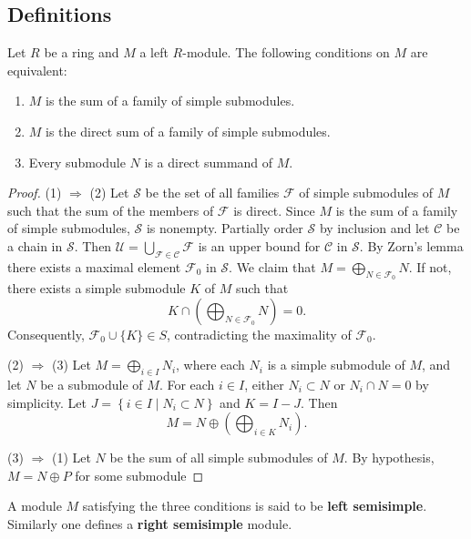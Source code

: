 \subsection{Definitions}
\begin{theorem}
    \label{thm: Semisimple modules}
    Let $R$ be a ring and $M$ a left $R$-module.
    The following conditions on $M$ are equivalent:
    \begin{enumerate}
        \item
              $M$ is the sum of a family of simple submodules.
        \item

              $M$ is the direct sum of a family of simple submodules.
        \item
              Every submodule $N$ is a direct summand of $M$.
    \end{enumerate}
    \begin{proof}
        (1) $\Rightarrow$ (2)
        Let $\mathcal{S}$ be the set of all families $\mathcal{F}$ of simple submodules of $M$ such that the sum of the members of $\mathcal{F}$ is direct.
        Since $M$ is the sum of a family of simple submodules, $\mathcal{S}$ is nonempty.
        Partially order $\mathcal{S}$ by inclusion and let $\mathcal{C}$ be a chain in $\mathcal{S}$.
        Then $\mathcal{U}=\bigcup_{\mathcal{F} \in \mathcal{C}} \mathcal{F}$ is an upper bound for $\mathcal{C}$ in $\mathcal{S}$.
        By Zorn's lemma there exists a maximal element $\mathcal{F}_0$ in $\mathcal{S}$.
        We claim that $M=\bigoplus_{N \in \mathcal{F}_0} N$.
        If not, there exists a simple submodule $K$ of $M$ such that
        \begin{equation*}
            K \cap\left(\bigoplus_{N \in \mathcal{F}_0} N\right)=0 .
        \end{equation*}
        Consequently, $\mathcal{F}_0 \cup\{K\} \in S$, contradicting the maximality of $\mathcal{F}_0$.

        (2) $\Rightarrow$ (3)
        Let $M=\bigoplus_{i \in I} N_i$, where each $N_i$ is a simple submodule of $M$, and let $N$ be a submodule of $M$.
        For each $i \in I$, either $N_i \subset N$ or $N_i \cap N=0$ by simplicity.
        Let $J=\left\{i \in I \mid N_i \subset N\right\}$ and $K=I-J$. Then
        \begin{equation*}
            M=N \oplus\left(\bigoplus_{i \in K} N_i\right) .
        \end{equation*}

        (3) $\Rightarrow$ (1)
        Let $N$ be the sum of all simple submodules of $M$. By hypothesis, $M=N \oplus P$ for some submodule
    \end{proof}

    \begin{remark}
        A module $M$ satisfying the three conditions is said to be \textbf{left semisimple}.
        Similarly one defines a \textbf{right semisimple} module.
    \end{remark}
\end{theorem}
